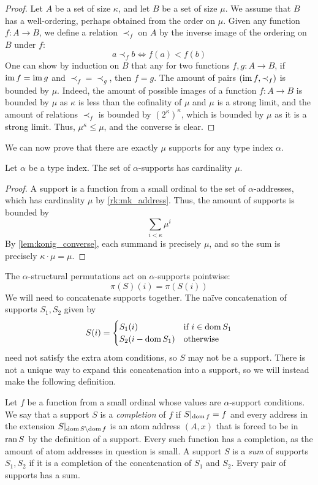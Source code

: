 \begin{proof}
    Let \( A \) be a set of size \( \kappa \), and let \( B \) be a set of size \( \mu \).
    We assume that \( B \) has a well-ordering, perhaps obtained from the order on \( \mu \).
    Given any function \( f : A \to B \), we define a relation \( \prec_f \) on \( A \) by the inverse image of the ordering on \( B \) under \( f \):
    \[ a \prec_f b \iff f(a) < f(b) \]
    One can show by induction on \( B \) that any for two functions \( f, g : A \to B \), if \( \operatorname{im} f = \operatorname{im} g \) and \( \prec_f = \prec_g \), then \( f = g \).
    The amount of pairs \( (\operatorname{im} f, \prec_f) \) is bounded by \( \mu \).
    Indeed, the amount of possible images of a function \( f : A \to B \) is bounded by \( \mu \) as \( \kappa \) is less than the cofinality of \( \mu \) and \( \mu \) is a strong limit, and the amount of relations \( \prec_f \) is bounded by \( (2^\kappa)^\kappa \), which is bounded by \( \mu \) as it is a strong limit.
    Thus, \( \mu^\kappa \leq \mu \), and the converse is clear.
\end{proof}
We can now prove that there are exactly \( \mu \) supports for any type index \( \alpha \).
\begin{proposition}
    \label{prop:mk_support}
    Let \( \alpha \) be a type index.
    The set of \( \alpha \)-supports has cardinality \( \mu \).
\end{proposition}
\begin{proof}
    A support is a function from a small ordinal to the set of \( \alpha \)-addresses, which has cardinality \( \mu \) by \cref{rk:mk_address}.
    Thus, the amount of supports is bounded by
    \[ \sum_{i < \kappa} \mu^i \]
    By \cref{lem:konig_converse}, each summand is precisely \( \mu \), and so the sum is precisely \( \kappa \cdot \mu = \mu \).
\end{proof}
The \( \alpha \)-structural permutations act on \( \alpha \)-supports pointwise:
\[ \pi(S)(i) = \pi(S(i)) \]
We will need to concatenate supports together.
The naïve concatenation of supports \( S_1, S_2 \) given by
\[ S(i) = \begin{cases}
    S_1(i) & \text{if } i \in \operatorname{dom} S_1 \\
    S_2(i - \operatorname{dom} S_1) & \text{otherwise}
\end{cases} \]
need not satisfy the extra atom conditions, so \( S \) may not be a support.
There is not a unique way to expand this concatenation into a support, so we will instead make the following definition.
\begin{definition}
    Let \( f \) be a function from a small ordinal whose values are \( \alpha \)-support conditions.
    We say that a support \( S \) is a \emph{completion} of \( f \) if \( S|_{\operatorname{dom} f} = f \) and every address in the extension \( S|_{\operatorname{dom} S \setminus \operatorname{dom} f} \) is an atom address \( (A, x) \) that is forced to be in \( \operatorname{ran} S \) by the definition of a support.
    Every such function has a completion, as the amount of atom addresses in question is small.
    A support \( S \) is a \emph{sum} of supports \( S_1, S_2 \) if it is a completion of the concatenation of \( S_1 \) and \( S_2 \).
    Every pair of supports has a sum.
\end{definition}
